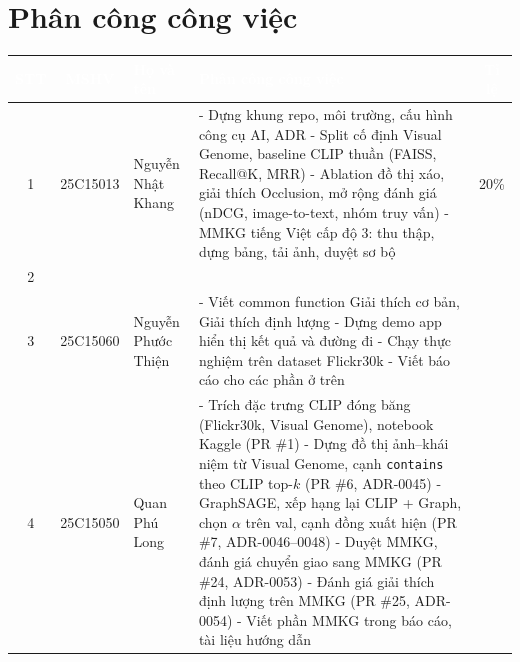\documentclass[12pt, a4paper]{article}
\newcommand{\code}[1]{\texttt{#1}}
\begin{document}
\clearpage
\thispagestyle{fancy}
\renewcommand{\contentsname}{\color{heading1}Mục Lục}
\tableofcontents
\clearpage

\section*{Phân công công việc}

\begin{table}[H]
    \centering
    \renewcommand{\arraystretch}{1.5}
    \begin{tabularx}{\textwidth}{|c|c|l|X|c|}
        \hline
        \rowcolor{madrid}\textcolor{white}{\textbf{STT}} & \textcolor{white}{\textbf{MSHV}} & \textcolor{white}{\textbf{Họ và tên}} & \textcolor{white}{\textbf{Phân công công việc}} & \textcolor{white}{\textbf{Tỉ lệ}} \\ \hline
        1 & 25C15013 & Nguyễn Nhật Khang & - Dựng khung repo, môi trường, cấu hình công cụ AI, ADR \newline - Split cố định Visual Genome, baseline CLIP thuần (FAISS, Recall@K, MRR) \newline - Ablation đồ thị xáo, giải thích Occlusion, mở rộng đánh giá (nDCG, image-to-text, nhóm truy vấn) \newline - MMKG tiếng Việt cấp độ 3: thu thập, dựng bảng, tải ảnh, duyệt sơ bộ & 20\% \\ \hline
        2 & & & & \\ \hline
        3 & 25C15060 & Nguyễn Phước Thiện & - Viết common function Giải thích cơ bản, Giải thích định lượng \newline - Dựng demo app hiển thị kết quả và đường đi \newline - Chạy thực nghiệm trên dataset Flickr30k \newline - Viết báo cáo cho các phần ở trên & \\ \hline
        4 & 25C15050 & Quan Phú Long & - Trích đặc trưng CLIP đóng băng (Flickr30k, Visual Genome), notebook Kaggle (PR \#1) \newline - Dựng đồ thị ảnh--khái niệm từ Visual Genome, cạnh \code{contains} theo CLIP top-$k$ (PR \#6, ADR-0045) \newline - GraphSAGE, xếp hạng lại CLIP + Graph, chọn $\alpha$ trên val, cạnh đồng xuất hiện (PR \#7, ADR-0046--0048) \newline - Duyệt MMKG, đánh giá chuyển giao sang MMKG (PR \#24, ADR-0053) \newline - Đánh giá giải thích định lượng trên MMKG (PR \#25, ADR-0054) \newline - Viết phần MMKG trong báo cáo, tài liệu hướng dẫn & \\ \hline

\end{tabularx}
\end{table}
\end{document}
